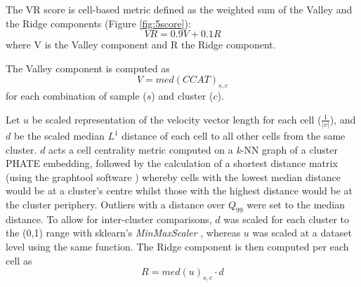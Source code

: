 The VR score is cell-based metric defined as the weighted sum of the Valley and the Ridge components (Figure \ref{fig:5score}):
\[VR = 0.9V+0.1R\]
where V is the Valley component and R the Ridge component.

The Valley component is computed as \[V = med(CCAT)_{s,c}\] for each combination of sample (\(s\)) and cluster (\(c\)). 

Let $u$ be scaled representation of the velocity vector length for each cell ($\frac{1}{|v|}$), and $d$ be the scaled median $L^1$ distance of each cell to all other cells from the same cluster. $d$ acts a cell centrality metric computed on a \emph{k}-NN graph of a cluster PHATE embedding, followed by the calculation of a shortest distance matrix (using the graphtool software \cite{peixoto_graph-tool_2014}) whereby cells with the lowest median distance would be at a cluster's centre whilst those with the highest distance would be at the cluster periphery. Outliers with a distance over $Q_{99}$ were set to the median distance. 
To allow for inter-cluster comparisons, $d$ was scaled for each cluster to the (0,1) range with sklearn's \emph{MinMaxScaler} \cite{pedregosa_scikit-learn_2011}, whereas $u$ was scaled at a dataset level using the same function.
The Ridge component is then computed per each cell as \[R = med(u)_{s,c} \cdot d\] 


